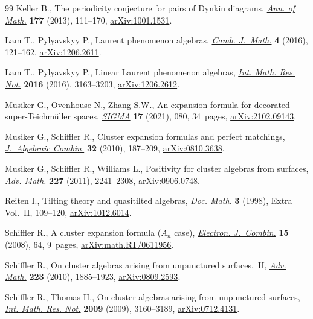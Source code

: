 \begin{thebibliography}{99}
Keller B., The periodicity conjecture for pairs of {D}ynkin diagrams,
 \href{https://doi.org/10.4007/annals.2013.177.1.3}{\textit{Ann. of Math.}} \textbf{177} (2013), 111--170, \href{https://arxiv.org/abs/1001.1531}{arXiv:1001.1531}.

Lam T., Pylyavskyy P., Laurent phenomenon algebras, \href{https://doi.org/10.4310/CJM.2016.v4.n1.a2}{\textit{Camb. J.~Math.}}
 \textbf{4} (2016), 121--162, \href{https://arxiv.org/abs/1206.2611}{arXiv:1206.2611}.

Lam T., Pylyavskyy P., Linear {L}aurent phenomenon algebras, \href{https://doi.org/10.1093/imrn/rnv237}{\textit{Int. Math.
 Res. Not.}} \textbf{2016} (2016), 3163--3203, \href{https://arxiv.org/abs/1206.2612}{arXiv:1206.2612}.

Musiker G., Ovenhouse N., Zhang S.W., An expansion formula for decorated
 super-{T}eichm\"uller spaces, \href{https://doi.org/10.3842/SIGMA.2021.080}{\textit{SIGMA}} \textbf{17} (2021), 080,
 34~pages, \href{https://arxiv.org/abs/2102.09143}{arXiv:2102.09143}.

Musiker G., Schiffler R., Cluster expansion formulas and perfect matchings,
 \href{https://doi.org/10.1007/s10801-009-0210-3}{\textit{J.~Algebraic Combin.}} \textbf{32} (2010), 187--209,
 \href{https://arxiv.org/abs/0810.3638}{arXiv:0810.3638}.

Musiker G., Schiffler R., Williams L., Positivity for cluster algebras from
 surfaces, \href{https://doi.org/10.1016/j.aim.2011.04.018}{\textit{Adv. Math.}} \textbf{227} (2011), 2241--2308,
 \href{https://arxiv.org/abs/0906.0748}{arXiv:0906.0748}.

Reiten I., Tilting theory and quasitilted algebras, \textit{Doc. Math.}
 \textbf{3} (1998), Extra Vol.~II, 109--120, \href{https://arxiv.org/abs/1012.6014}{arXiv:1012.6014}.

Schiffler R., A cluster expansion formula ({$A_n$} case), \href{https://doi.org/10.37236/788}{\textit{Electron.
 J.~Combin.}} \textbf{15} (2008), 64, 9~pages, \href{https://arxiv.org/abs/math.RT/0611956}{arXiv:math.RT/0611956}.

Schiffler R., On cluster algebras arising from unpunctured surfaces.~{II},
 \href{https://doi.org/10.1016/j.aim.2009.10.015}{\textit{Adv. Math.}} \textbf{223} (2010), 1885--1923, \href{https://arxiv.org/abs/0809.2593}{arXiv:0809.2593}.

Schiffler R., Thomas H., On cluster algebras arising from unpunctured surfaces,
 \href{https://doi.org/10.1093/imrn/rnp047}{\textit{Int. Math. Res. Not.}} \textbf{2009} (2009), 3160--3189,
 \href{https://arxiv.org/abs/0712.4131}{arXiv:0712.4131}.

\end{thebibliography}
